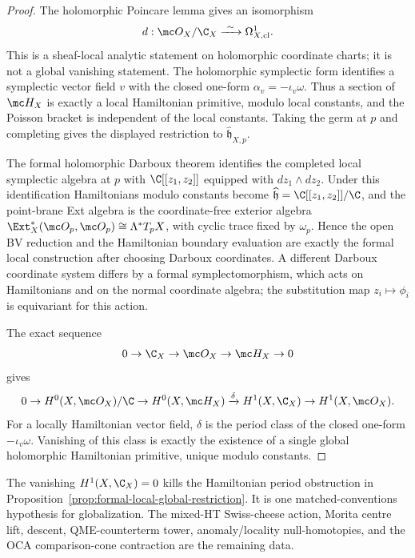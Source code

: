 \documentclass[11pt]{memoir}
\begin{document}
\begin{proof}
  The holomorphic Poincare lemma gives an isomorphism
  $$d:\mc O_X/\C_X\xrightarrow{\ \sim\ }\Omega^1_{X,\mathrm{cl}}.$$
  This is a sheaf-local analytic statement on holomorphic coordinate
  charts; it is not a global vanishing statement.
  The holomorphic symplectic form identifies a symplectic vector field $v$
  with the closed one-form $\alpha_v=-\iota_v\omega$. Thus a section of
  $\mc H_X$ is exactly a local Hamiltonian primitive, modulo local
  constants, and the Poisson bracket is independent of the local constants.
  Taking the germ at $p$ and completing gives the displayed restriction to
  $\widehat{\mathfrak h}_{X,p}$.

  The formal holomorphic Darboux theorem identifies the completed local
  symplectic algebra at $p$ with $\C[[z_1,z_2]]$ equipped with
  $dz_1\wedge dz_2$. Under this identification Hamiltonians modulo
  constants become $\widehat{\mathfrak h}=\C[[z_1,z_2]]/\C$, and the
  point-brane Ext algebra is the coordinate-free exterior algebra
  $\Ext_X^*(\mc O_p,\mc O_p)\cong\Lambda^*T_pX$, with cyclic trace fixed by
  $\omega_p$. Hence the open BV reduction and the Hamiltonian boundary
  evaluation are exactly the formal local construction after choosing
  Darboux coordinates. A different Darboux coordinate system differs by a
  formal symplectomorphism, which acts on Hamiltonians and on the normal
  coordinate algebra; the substitution map $z_i\mapsto\phi_i$ is
  equivariant for this action.

  The exact sequence
  $$0\to\C_X\to\mc O_X\to\mc H_X\to0$$
  gives
  $$0\to H^0(X,\mc O_X)/\C
    \to H^0(X,\mc H_X)
    \xrightarrow{\delta}H^1(X,\C_X)
    \to H^1(X,\mc O_X).$$
  For a locally Hamiltonian vector field, $\delta$ is the period class of
  the closed one-form $-\iota_v\omega$. Vanishing of this class is exactly
  the existence of a single global holomorphic Hamiltonian primitive,
  unique modulo constants.
\end{proof}

\begin{rmk}
  The vanishing \(H^1(X,\C_X)=0\) kills the Hamiltonian period
  obstruction in
	  Proposition~\ref{prop:formal-local-global-restriction}.  It is one
	  matched-conventions hypothesis for globalization.  The mixed-HT
		  Swiss-cheese action, Morita centre lift, descent,
		  QME-counterterm tower, anomaly/locality null-homotopies, and the OCA comparison-cone
	  contraction are the remaining data.
\end{rmk}
\end{document}

